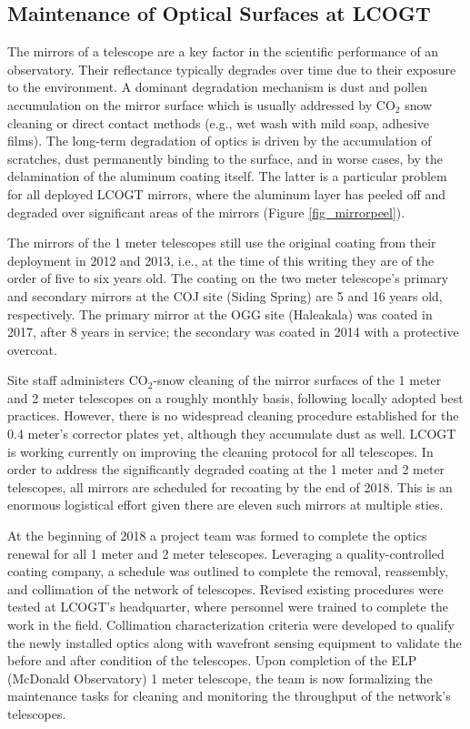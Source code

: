 \documentclass[]{spie}
\begin{document}
\subsection{Maintenance of Optical Surfaces at LCOGT}


The mirrors of a telescope are a key factor in the  scientific performance of an observatory. Their
reflectance typically degrades over time due to their exposure to the environment. A dominant
degradation mechanism is dust and pollen accumulation on the mirror surface which is usually
addressed by CO$_2$ snow cleaning or direct contact methods (e.g., wet wash with mild soap, adhesive
films). The long-term degradation of optics is driven by the accumulation of scratches, dust
permanently binding to the surface, and in worse cases, by the delamination of the aluminum coating
itself. The latter is a particular problem for all deployed LCOGT mirrors, where the aluminum layer
has peeled off and degraded over significant areas of the mirrors (Figure \ref{fig_mirrorpeel}).

The mirrors of the 1 meter telescopes still use the original coating from their deployment in 2012
and 2013, i.e., at the time of this writing they are of the order of five to six years old. The
coating  on the two meter telescope's  primary and secondary mirrors at the COJ site (Siding
Spring) are 5  and 16 years old, respectively. The primary  mirror at the OGG site (Haleakala) was
coated in 2017, after 8 years in service; the secondary  was coated in 2014 with a protective
overcoat.

Site staff administers CO$_2$-snow cleaning of the mirror surfaces of the 1 meter and 2 meter
telescopes on a roughly monthly basis, following locally adopted best practices. However, there is
no widespread cleaning procedure established for the 0.4 meter's corrector plates yet, although
they accumulate dust as well. LCOGT is working currently on improving the cleaning protocol for all
telescopes. In order to address the significantly degraded coating at the 1 meter and 2 meter
telescopes, all mirrors are scheduled for recoating by the end of 2018. This is an enormous
logistical effort given there are eleven such mirrors at multiple sties.

At the beginning of 2018 a project team was formed to complete the optics renewal for all 1 meter and
2 meter telescopes.  Leveraging a quality-controlled coating company, a schedule was outlined to complete
the removal, reassembly, and collimation of the network of telescopes.  Revised 
existing procedures were tested at LCOGT's headquarter, where personnel were trained to complete the
work in the field.  Collimation characterization criteria were developed to qualify the newly
installed optics along with wavefront sensing equipment to validate the before and after condition
of the telescopes.  Upon completion of the ELP (McDonald Observatory) 1 meter telescope, the team 
is now formalizing the maintenance tasks for cleaning and monitoring the throughput of the network's 
telescopes.
\end{document}
